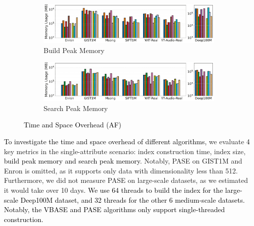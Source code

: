 \documentclass[sigconf, nonacm, pdfa]{acmart}
\begin{document}
{\begin{figure}[t]
		\begin{subfigure}{\columnwidth}
			\centering
			
			\includegraphics[width=0.99\linewidth]{figures/indexData/exp_7_memory_mb_comparison_query1.pdf}
			\caption{Build Peak Memory }
			\label{fig:build_memory_mb_comparison}
		\end{subfigure}
		
		\begin{subfigure}{\columnwidth}
			\centering

			\includegraphics[width=0.99\linewidth]{figures/searchMem/label_memory_comparison.pdf}
			\caption{Search Peak Memory}
			\label{fig:search_memory_mb_comparison}
		\end{subfigure}
		
		\setlength{\abovecaptionskip}{0.15cm}
		\setlength{\belowcaptionskip}{-0.10cm}
		\caption{\textcolor{black}{Time and Space Overhead (AF)}}
		\label{fig:build_index_comparison}
	\end{figure}
	
	
	
	\textcolor{black}{To investigate the time and space overhead of different algorithms,} we evaluate \textcolor{black}{4} key metrics in the single-attribute scenario: index construction time, index size, \textcolor{black}{build peak memory and search peak memory}. Notably, PASE on GIST1M and Enron is omitted, as it supports only data with dimensionality less than 512. Furthermore, we did not measure PASE on large-scale datasets, as we estimated it would take over 10 days. \textcolor{black}{We use 64 threads to build the index for the large-scale Deep100M dataset, and 32 threads for the other 6 medium-scale datasets. Notably, the VBASE and PASE algorithms only support single-threaded construction.}
	
}
\end{document}
